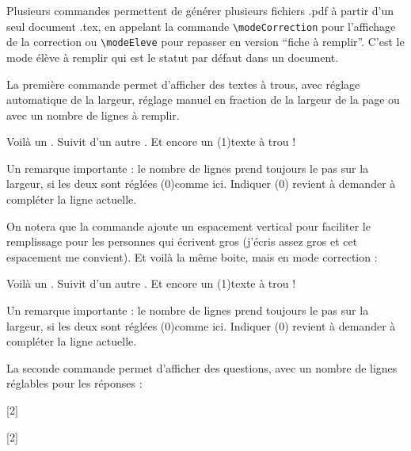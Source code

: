

Plusieurs commandes permettent de générer plusieurs fichiers .pdf à partir d'un seul document .tex, en appelant la commande \lstinline|\modeCorrection| pour l'affichage de la correction ou \lstinline|\modeEleve| pour repasser en version ``fiche à remplir''. 
C'est le mode élève à remplir qui est le statut par défaut dans un document.

La première commande permet d'afficher des textes à trous, avec réglage automatique de la largeur, réglage manuel en fraction de la largeur de la page ou avec un nombre de lignes à remplir.
\begin{boiteCodeTex}{}
Voilà un . %
Suivit d'un autre . %
Et encore un \texteTrou(1){texte à trou} ! %

  
Un remarque importante : le nombre de lignes prend toujours le pas sur la largeur,
si les deux sont réglées \texteTrou[0.3](0){comme ici.}
Indiquer (0) revient à demander à compléter la ligne actuelle.
\end{boiteCodeTex}

On notera que la commande ajoute un espacement vertical pour faciliter le remplissage pour les personnes qui écrivent gros (j'écris assez gros et cet espacement me convient).
Et voilà la même boite, mais en mode correction :
\begin{boiteCodeTex}{}
\modeCorrection
Voilà un . %
Suivit d'un autre . %
Et encore un \texteTrou(1){texte à trou} ! %

  
Un remarque importante : le nombre de lignes prend toujours le pas sur la largeur,
si les deux sont réglées \texteTrou[0.3](0){comme ici.}
Indiquer (0) revient à demander à compléter la ligne actuelle.
\modeEleve
\end{boiteCodeTex}

La seconde commande permet d'afficher des questions, avec un nombre de lignes réglables pour les réponses :
\begin{boiteCodeTex}{}
  
  [2]

  \modeCorrection \setcounter{questionNum}{0}
  [2]
  \modeEleve
\end{boiteCodeTex}

